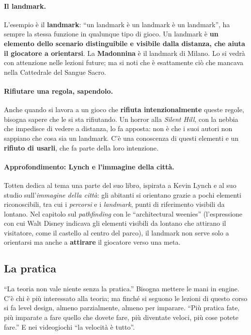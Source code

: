 \paragraph{Il landmark.} L'esempio è il \textbf{landmark}: ``un landmark è un
landmark è un landmark'', ha sempre la stessa funzione in qualunque tipo di
gioco. Un landmark è \textbf{un elemento dello scenario distinguibile e
visibile dalla distanza, che aiuta il giocatore a orientarsi}. La
\textbf{Madonnina} è il landmark di Milano. Lo si vedrà con attenzione nelle
lezioni future; ma si noti che è esattamente ciò che mancava nella Cattedrale
del Sangue Sacro.

\paragraph{Rifiutare una regola, sapendolo.} Anche quando si lavora a un gioco
che \textbf{rifiuta intenzionalmente} queste regole, bisogna sapere che le si
sta rifiutando. Un horror alla \emph{Silent Hill}, con la nebbia che impedisce
di vedere a distanza, lo fa apposta: non è che i suoi autori non sappiano che
cosa sia un landmark. C'è una conoscenza di questi elementi e un
\textbf{rifiuto di usarli}, che fa parte della loro intenzione.

\paragraph{Approfondimento: Lynch e l'immagine della città.} Totten dedica
al tema una parte del suo libro, ispirata a Kevin Lynch e al suo studio
sull'\emph{immagine della città}: gli abitanti si orientano grazie a pochi
elementi riconoscibili, tra cui i \emph{percorsi} e i \emph{landmark}, punti di
riferimento visibili da lontano. Nel capitolo sul \emph{pathfinding} con le
``architectural weenies'' (l'espressione con cui Walt Disney indicava gli
elementi visibili da lontano che attirano il visitatore, come il castello al
centro del parco), il landmark non serve solo a orientarsi ma anche a
\textbf{attirare} il giocatore verso una meta.

\subsection{La pratica}

``La teoria non vale niente senza la pratica.'' Bisogna mettere le mani in
engine. C'è chi è più interessato alla teoria; ma finché si seguono le lezioni
di questo corso si fa level design, almeno parzialmente, almeno per imparare.
``Più pratica fate, più imparate a fare quello che dovete fare, più diventate
veloci, più cose potete fare.'' E nei videogiochi ``la velocità è tutto''.

